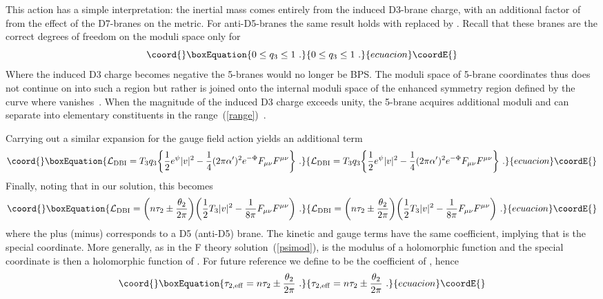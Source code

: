 \documentclass[a4paper,12pt]{article}
\renewcommand{\=}[1]{\bar{#1}}
\begin{document}
This action has a
simple interpretation: the inertial mass
comes entirely from the induced D3-brane charge, with an additional factor of
\coordHE{} from the effect of the D7-branes on the metric.  For anti-D5-branes
the same result holds with \coordHE{} replaced by \coordHE{}.  Recall that these branes are the correct degrees of
freedom on the moduli space only for
\begin{equation}\coord{}\boxEquation{
0 \leq q_3 \leq 1\ . \label{range}
}{
0 \leq q_3 \leq 1\ . }{ecuacion}\coordE{}\end{equation}
Where the induced
D3 charge becomes negative the 5-branes would no longer be BPS.  The moduli
space of 5-brane coordinates thus does not continue on into such a region but
rather is joined onto the internal moduli space of the enhanced symmetry
region defined by the curve where \coordHE{} vanishes~\cite{enhan}.
When the magnitude of the induced D3 charge exceeds unity, the 5-brane
acquires additional moduli and can separate into elementary constituents in
the range~(\ref{range})~\cite{n2me}.

Carrying out a similar expansion for the gauge field action yields
an additional term
\begin{equation}\coord{}\boxEquation{
{\cal L}_{\rm DBI} = T_3 q_3 \biggl\{ \frac{1}{2} e^{\psi}{|v|^2}
- \frac{1}{4}  (2\pi\alpha')^2 e^{-\Phi}{F_{\mu\nu} F^{\mu\nu} \biggr\}\ .}
}{
{\cal L}_{\rm DBI} = T_3 q_3 \biggl\{ \frac{1}{2} e^{\psi}{|v|^2}
- \frac{1}{4}  (2\pi\alpha')^2 e^{-\Phi}{F_{\mu\nu} F^{\mu\nu} \biggr\}\ .}
}{ecuacion}\coordE{}\end{equation}
Finally, noting that \coordHE{} in our solution, this
becomes
\begin{equation}\coord{}\boxEquation{
{\cal L}_{\rm DBI} = \biggl( n \tau_2 \pm \frac{\theta_2}{2\pi} \biggr)
\biggl(
\frac{1}{2} T_3 {|v|^2}  - \frac{1}{8\pi} F_{\mu\nu} F^{\mu\nu}
\biggr)\ .
}{
{\cal L}_{\rm DBI} = \biggl( n \tau_2 \pm \frac{\theta_2}{2\pi} \biggr)
\biggl(
\frac{1}{2} T_3 {|v|^2}  - \frac{1}{8\pi} F_{\mu\nu} F^{\mu\nu}
\biggr)\ .
}{ecuacion}\coordE{}\end{equation}
where the plus (minus) corresponds to a D5 (anti-D5) brane. The kinetic and gauge 
terms have the same coefficient, implying that \coordHE{} is
the \coordHE{} special coordinate.  More generally, as in the F theory
solution~(\ref{psimod}), \coordHE{} is the modulus of a holomorphic
function and the special coordinate is then a holomorphic function of \coordHE{}.
For future reference we define  \coordHE{} to be the coefficient of
\coordHE{}, hence
\begin{equation}\coord{}\boxEquation{
\tau_{2,\rm eff} = n \tau_2 \pm \frac{\theta_2}{2\pi}\ . \label{teff}
}{
\tau_{2,\rm eff} = n \tau_2 \pm \frac{\theta_2}{2\pi}\ . }{ecuacion}\coordE{}\end{equation}
\end{document}

